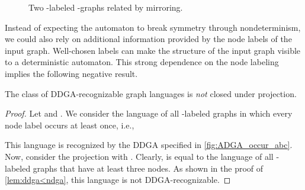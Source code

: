 \documentclass[a4paper,11pt,twoside]{report} \pdfoutput=1
\begin{document}
\begin{figure}[h!]
  \alignpic
  \begin{subfigure}{0.35\textwidth}
    \centering
         \caption{}
    \label{fig:graph_two_nodes}
  \end{subfigure}
  \begin{subfigure}{0.35\textwidth}
    \centering
         \caption{}
    \label{fig:graph_three_nodes}
  \end{subfigure}
  \caption{Two -labeled -graphs related by
    mirroring.}
  \label{fig:graphs_two_and_three_nodes}
\end{figure}

Instead of expecting the automaton to break symmetry through
nondeterminism, we could also rely on additional information provided
by the node labels of the input graph. Well-chosen labels can make the
structure of the input graph visible to a deterministic
automaton. This strong dependence on the node labeling implies the
following negative result.

\begin{lemma}[Projection] \label{lem:ddga-projection}
  The class  of DDGA-recognizable graph languages is
  \emph{not} closed under projection.
\end{lemma}

\begin{proof}
  Let  and . We consider the language
   of all -labeled graphs in which every node
  label occurs at least once, i.e.,
  
  This language is recognized by the DDGA 
  specified in \cref{fig:ADGA_occur_abc}. Now, consider the projection
   with . Clearly,
   is equal to the language  of
  all -labeled graphs that have at least three nodes. As
  shown in the proof of \cref{lem:ddga<ndga}, this language is not
  DDGA-recognizable.
\end{proof}
\end{document}
